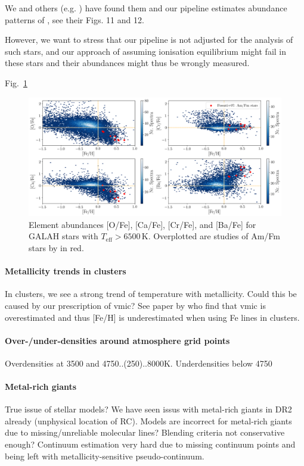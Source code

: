 \documentclass[fleqn,usenatbib,useAMS]{mnras}
\begin{document}
We and others (e.g. \citet{Xiang2020}) have found them and our pipeline estimates abundance patterns of  \citet{Fossati2007,Fossati2008}, see their Figs. 11 and 12. 

However, we want to stress that our pipeline is not adjusted for the analysis of such stars, and our approach of assuming ionisation equilibrium might fail in these stars and their abundances might thus be wrongly measured. 

Fig.~\ref{fig:GALAH_DR3_AmFmStars}

\begin{figure}
\centering
\includegraphics[width=\textwidth]{figures/GALAH_DR3_AmFmStars.png}
\caption{Element abundances [O/Fe], [Ca/Fe], [Cr/Fe], and [Ba/Fe] for GALAH stars with $T_\text{eff} > 6500\,\mathrm{K}$. Overplotted are studies of Am/Fm stars by \citet{Fossati2007} in red.}
\label{fig:GALAH_DR3_AmFmStars}
\end{figure}

\paragraph*{Metallicity trends in clusters}

In clusters, we see a strong trend of temperature with metallicity. Could this be caused by our prescription of vmic? See paper by \citet{Baratella2020} who find that vmic is overestimated and thus [Fe/H] is underestimated when using Fe lines in clusters.

\paragraph*{Over-/under-densities around atmosphere grid points} Overdensities at 3500 and 4750..(250)..8000K. Underdensities below 4750

\paragraph*{Metal-rich giants} True issue of stellar models? We have seen issus with metal-rich giants in DR2 already (unphysical location of RC). Models are incorrect for metal-rich giants due to missing/unreliable molecular lines? Blending criteria not conservative enough? Continuum estimation very hard due to missing continuum points and being left with metallicity-sensitive pseudo-continuum.
\end{document}

